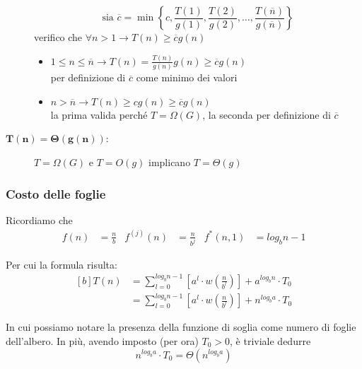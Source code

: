 \begin{description}
        $$ \text{sia } \overline{c} = \min \left\{ c, \frac{T(1)}{g(1)}, \frac{T(2)}{g(2)} ,
            \dots, \frac{T( \overline{n})}{ g( \overline{n}) } \right\} $$
        verifico che $ \forall n>1 \rightarrow T(n) \geq \overline{c} g(n) $
        \begin{itemize}[noitemsep,topsep=0pt,parsep=0pt,partopsep=0pt]
            \item $1 \leq n \leq \overline{n} \rightarrow T(n) = \frac{T(n)}{g(n)}g(n) \geq \overline{c}g(n) $ \\
                per definizione di $ \overline{c} $ come minimo dei valori
            \item $ n > \overline{n} \rightarrow T(n) \geq cg(n) \geq \overline{c}g(n)$ \\
                la prima valida perché $T=\Omega(G)$, la seconda per definizione di $\overline{c}$
        \end{itemize}
    \item[$\bm{T(n)=\Theta \left( g(n) \right)}$:] $T=\Omega(G)$ e $T=O(g)$ implicano $T=\Theta(g)$
\end{description}

\subsubsection{Costo delle foglie}
Ricordiamo che 
\begin{align*}
    f(n)&= \frac{n}{b} & f^{(j)}(n) &= \frac{n}{b^j} & f^*(n,1) &= log_b n -1
\end{align*}

Per cui la formula risulta:
\begin{equation}
    \begin{aligned}[b]
        T(n) &= \sum_{l=0}^{log_b n -1} \left[ a^l \cdot w \left( \frac{n}{b^l} \right) \right] + a^{log_b n} \cdot T_0 \\
        &= \sum_{l=0}^{log_b n -1} \left[ a^l \cdot w \left( \frac{n}{b^l} \right) \right] + n^{log_b a} \cdot T_0
        \label{eq:masterchiusa1}
    \end{aligned}
\end{equation}

In cui possiamo notare la presenza della funzione di soglia come numero di foglie dell'albero. In più, avendo imposto (per ora) $T_0>0$, è triviale dedurre \begin{equation}
    n^{log_b a} \cdot T_0 = \Theta \left( n^{log_b a} \right) 
    \label{eq:masterfoglie}
\end{equation}


